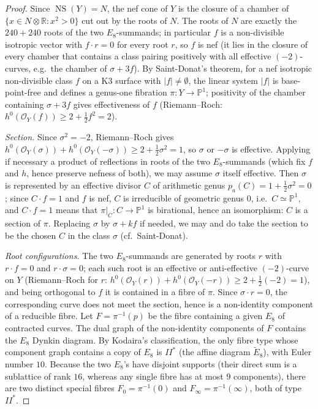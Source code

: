 \documentclass[11pt]{article}
\newcommand{\PP}{\mathbb{P}}
\newcommand{\bR}{\mathbb{R}}
\DeclareMathOperator{\NS}{NS}
\begin{document}
\begin{proof}
Since $\NS(Y)=N$, the nef cone of $Y$ is the closure of a chamber of
$\{x\in N\otimes\bR : x^2>0\}$ cut out by the roots of $N$. The roots of $N$
are exactly the $240+240$ roots of the two $E_8$-summands; in particular $f$
is a non-divisible isotropic vector with $f\cdot r=0$ for every root $r$, so
$f$ is nef (it lies in the closure of every chamber that contains a class
pairing positively with all effective $(-2)$-curves, e.g.\ the chamber of
$\sigma+3f$). By Saint-Donat's theorem, for a nef isotropic non-divisible
class $f$ on a K3 surface with $|f|\neq\emptyset$, the linear system $|f|$
is base-point-free and defines a genus-one fibration
$\pi\colon Y\to\PP^1$; positivity of the chamber containing $\sigma+3f$
gives effectiveness of $f$ (Riemann--Roch: $h^0(\mathcal O_Y(f))\ge
2+\tfrac12 f^2=2$).

\emph{Section.} Since $\sigma^2=-2$, Riemann--Roch gives
$h^0(\mathcal O_Y(\sigma))+h^0(\mathcal O_Y(-\sigma))\ge
2+\tfrac12\sigma^2=1$, so $\sigma$ or $-\sigma$ is effective. Applying if
necessary a product of reflections in roots of the two $E_8$-summands
(which fix $f$ and $h$, hence preserve nefness of both), we may assume
$\sigma$ itself effective. Then $\sigma$ is represented by an effective
divisor $C$ of arithmetic genus $p_a(C)=1+\frac12\sigma^2=0$; since
$C\cdot f=1$ and $f$ is nef, $C$ is irreducible of geometric genus $0$,
i.e.\ $C\simeq\PP^1$, and $C\cdot f=1$ means that $\pi|_C\colon C\to\PP^1$
is birational, hence an isomorphism: $C$ is a section of $\pi$. Replacing
$\sigma$ by $\sigma+kf$ if needed, we may and do take the section to be the
chosen $C$ in the class $\sigma$ (cf.\ Saint-Donat).

\emph{Root configurations.} The two $E_8$-summands are generated by roots
$r$ with $r\cdot f=0$ and $r\cdot\sigma=0$; each such root is an effective
or anti-effective $(-2)$-curve on $Y$ (Riemann--Roch for $r$: $h^0(\mathcal
O_Y(r))+h^0(\mathcal O_Y(-r))\ge 2+\frac12(-2)=1$), and being orthogonal
to $f$ it is contained in a fibre of $\pi$. Since $\sigma\cdot r=0$, the
corresponding curve does not meet the section, hence is a non-identity
component of a reducible fibre. Let $F=\pi^{-1}(p)$ be the fibre containing
a given $E_8$ of contracted curves. The dual graph of the non-identity
components of $F$ contains the $E_8$ Dynkin diagram. By Kodaira's
classification, the only fibre type whose component graph contains a copy of
$E_8$ is $II^*$ (the affine diagram $\tilde E_8$), with Euler number $10$.
Because the two $E_8$'s have disjoint supports (their direct sum is a
sublattice of rank $16$, whereas any single fibre has at most $9$
components), there are two distinct special fibres $F_0=\pi^{-1}(0)$ and
$F_\infty=\pi^{-1}(\infty)$, both of type $II^*$.


\end{proof}
\end{document}
